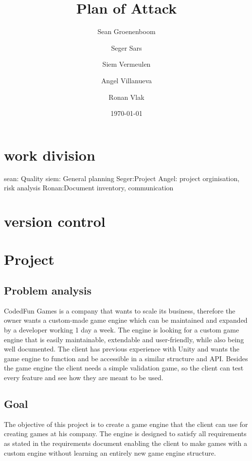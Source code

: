 \documentclass{article} %
\title{Plan of Attack} %
\author{Sean Groenenboom \and Seger Sars \and Siem Vermeulen \and Angel Villanueva \and Ronan Vlak} %
\date{\today} %
\begin{document}
    \maketitle %
    \newpage

    \tableofcontents %
    \newpage

    \section{work division}
    sean: Quality
    siem: General planning
    Seger:Project
    Angel: project orginisation, risk analysis
    Ronan:Document inventory, communication
    \newpage

    \section{version control}
    \newpage
            
    \section{Project}
    \subsection{Problem analysis}
    CodedFun Games is a company that wants to scale its business, therefore
    the owner wants a custom-made game engine which can be maintained and expanded by a developer working 1 day a week.
    The engine is looking for a custom game engine that is easily maintainable, extendable and user-friendly, while also being well documented.
    The client has previous experience with Unity and wants the game engine to function and be accessible in a similar structure and API.
    \newline \newline
    Besides the game engine the client needs a simple validation game, so the client can test every feature and see how they are meant to be used.

    \subsection{Goal}
    The objective of this project is to create a game engine that the client can use for creating games at his company.
    The engine is designed to satisfy all requirements as stated in the requirements document enabling the client to make games with a custom engine without learning an entirely new game engine structure.
\end{document}
